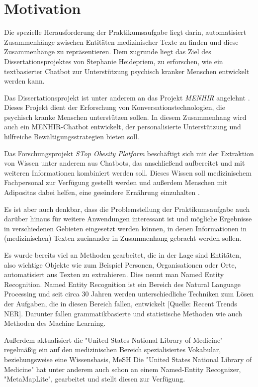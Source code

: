 \section{Motivation}

Die spezielle Herausforderung der Praktikumsaufgabe liegt darin, automatisiert Zusammenhänge zwischen Entitäten medizinischer Texte zu finden und diese Zusammenhänge zu repräsentieren. Dem zugrunde liegt das Ziel des Dissertationsprojektes von Stephanie Heidepriem, zu erforschen, wie ein textbasierter Chatbot zur Unterstützung 
psychisch kranker Menschen entwickelt werden kann. 

Das Dissertationsprojekt  ist unter anderem an das Projekt \emph{MENHIR} angelehnt \cite{menhir}. Dieses Projekt dient der Erforschung von Konversationstechnologien, die psychisch kranke Menschen unterstützen sollen. In diesem Zusammenhang wird auch 
ein MENHIR-Chatbot entwickelt, der personalisierte Unterstützung und hilfreiche Bewältigungsstrategien bieten soll. 

Das Forschungsprojekt \emph{STop Obesity Platform} beschäftigt sich mit der Extraktion von Wissen unter anderem aus Chatbots, das anschließend aufbereitet und mit weiteren Informationen kombiniert werden soll. Dieses Wissen soll medizinischem Fachpersonal zur Verfügung gestellt werden und außerdem Menschen mit Adipositas dabei helfen, eine gesündere Ernährung einzuhalten \cite{stopobesity}.


Es ist aber auch denkbar, dass die Problemstellung der Praktikumsaufgabe auch darüber hinaus für weitere Anwendungen interessant ist und mögliche Ergebnisse in verschiedenen Gebieten eingesetzt werden können, in denen Informationen in (medizinischen) Texten zueinander in Zusammenhang gebracht werden sollen.

Es wurde bereits viel an Methoden gearbeitet, die in der Lage sind Entitäten, also wichtige Objekte wie zum Beispiel Personen, 
Organisationen oder Orte, automatisiert aus Texten zu extrahieren. Dies nennt man Named Entity Recognition. Named Entity 
Recognition ist ein Bereich des Natural Language Processing und seit circa 30 Jahren werden unterschiedliche Techniken 
zum Lösen der Aufgaben, die in diesen Bereich fallen, entwickelt [Quelle: Recent Trends NER]. Darunter fallen 
grammatikbasierte und statistische Methoden wie auch Methoden des Machine Learning.

Außerdem aktualisiert die "United States National Library of Medicine" regelmäßig ein auf den medizinischen Bereich 
spezialisiertes Vokabular, beziehungsweise eine Wissensbasis, MeSH \cite{mesh}
Die "United States National Library of Medicine" hat unter anderem auch schon an einem Named-Entity Recognizer,
"MetaMapLite", gearbeitet und stellt diesen zur Verfügung. \cite{metamaplite}

